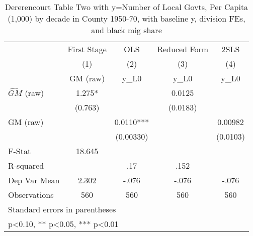 \begin{table}[htbp]\centering
\def\sym#1{\ifmmode^{#1}\else\(^{#1}\)\fi}
\caption{Dererencourt Table Two with y=Number of Local Govts, Per Capita (1,000) by decade in County 1950-70, with baseline y, division FEs, and black mig share}
\begin{tabular}{l*{4}{c}}
\toprule
                    & First Stage   &         OLS   &Reduced Form   &        2SLS   \\
                    &\multicolumn{1}{c}{(1)}&\multicolumn{1}{c}{(2)}&\multicolumn{1}{c}{(3)}&\multicolumn{1}{c}{(4)}\\
                    &\multicolumn{1}{c}{GM  (raw)}&\multicolumn{1}{c}{y\_L0}&\multicolumn{1}{c}{y\_L0}&\multicolumn{1}{c}{y\_L0}\\
\midrule
$\hat{GM}$ (raw)    &       1.275*  &               &      0.0125   &               \\
                    &     (0.763)   &               &    (0.0183)   &               \\
\addlinespace
GM  (raw)           &               &      0.0110***&               &     0.00982   \\
                    &               &   (0.00330)   &               &    (0.0103)   \\
\midrule
F-Stat              &      18.645   &               &               &               \\
R-squared           &               &         .17   &        .152   &               \\
Dep Var Mean        &       2.302   &       -.076   &       -.076   &       -.076   \\
Observations        &         560   &         560   &         560   &         560   \\
\bottomrule
\multicolumn{5}{l}{\footnotesize Standard errors in parentheses}\\
\multicolumn{5}{l}{\footnotesize * p<0.10, ** p<0.05, *** p<0.01}\\
\end{tabular}
\end{table}
